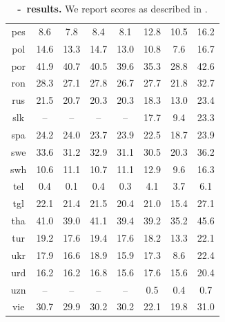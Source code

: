 \begin{table}[htb]
\begin{tabular}{@{}cccccccc@{}}
        pes & 8.6 & 7.8 & 8.4 & 8.1 & 12.8 & 10.5 & 16.2 \\
        pol & 14.6 & 13.3 & 14.7 & 13.0 & 10.8 & 7.6 & 16.7 \\
        por & 41.9 & 40.7 & 40.5 & 39.6 & 35.3 & 28.8 & 42.6 \\
        ron & 28.3 & 27.1 & 27.8 & 26.7 & 27.7 & 21.8 & 32.7 \\
        rus & 21.5 & 20.7 & 20.3 & 20.3 & 18.3 & 13.0 & 23.4 \\
        slk &  --  &  --  &  --  &  --  & 17.7 & 9.4 & 23.3 \\
        spa & 24.2 & 24.0 & 23.7 & 23.9 & 22.5 & 18.7 & 23.9 \\
        swe & 33.6 & 31.2 & 32.9 & 31.1 & 30.5 & 20.3 & 36.2 \\
        swh & 10.6 & 11.1 & 10.7 & 11.1 & 12.9 & 9.6 & 16.3 \\
        tel & 0.4 & 0.1 & 0.4 & 0.3 & 4.1 & 3.7 & 6.1 \\
        tgl & 22.1 & 21.4 & 21.5 & 20.4 & 21.0 & 15.4 & 27.1 \\
        tha & 41.0 & 39.0 & 41.1 & 39.4 & 39.2 & 35.2 & 45.6 \\
        tur & 19.2 & 17.6 & 19.4 & 17.6 & 18.2 & 13.3 & 22.1 \\
        ukr & 17.9 & 16.6 & 18.9 & 15.9 & 17.3 & 8.6 & 22.4 \\
        urd & 16.2 & 16.2 & 16.8 & 15.6 & 17.6 & 15.6 & 20.4 \\
        uzn &  --  &  --  &  --  &  --  & 0.5 & 0.4 & 0.7 \\
        vie & 30.7 & 29.9 & 30.2 & 30.2 & 22.1 & 19.8 & 31.0 \\
    \bottomrule
    \end{tabular}
    \caption{\textbf{\fleurs-\sst~\engx results.} We report \asrbleu scores as described in . }\label{tbl:fleurs:sst:engx}
\end{table}